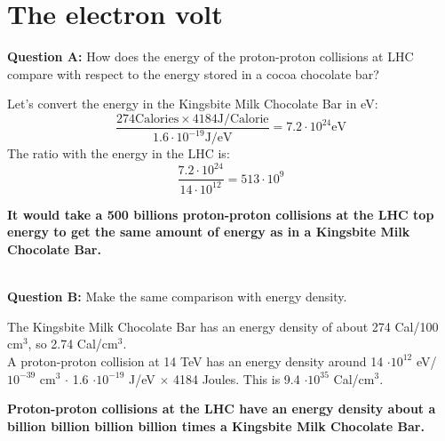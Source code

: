 \documentclass[12pt]{article}
\begin{document}
\section{The electron volt}
% 
% 


\textbf{Question A:} How does the energy of the proton-proton collisions at LHC compare with respect to the energy stored in a cocoa chocolate bar?\\ 

{\color{blue}

Let's convert the energy in the Kingsbite Milk Chocolate Bar in eV:
\begin{equation}
 \frac{ 274 \text{Calories} \times 4184 \text{J/Calorie} }{ 1.6 \cdot 10^{-19} \text{J/eV}} = 7.2 \cdot 10^{24} \text{eV}
\end{equation}
The ratio with the energy in the LHC is:
\begin{equation}
 \frac{7.2 \cdot 10^{24}}{14 \cdot 10^{12}} = 513 \cdot 10^{9}
\end{equation}

\textbf{It would take a 500 billions proton-proton collisions at the LHC top energy to get the same amount of energy as in a Kingsbite Milk Chocolate Bar.}
}\\

\textbf{Question B:} Make the same comparison with energy density.\\

{\color{blue}
The Kingsbite Milk Chocolate Bar has an energy density of about 274 Cal/100 cm$^3$, so 2.74 Cal/cm$^3$.\\
A proton-proton collision at 14 TeV has an energy density around 14 $\cdot 10^{12}$ eV/$10^{-39}$ cm$^3$ $\cdot$ 1.6 $\cdot 10^{-19}$ J/eV $\times$ 4184 Joules. This is 9.4 $\cdot 10^{35}$ Cal/cm$^3$.\\

\begin{center}
\textbf{Proton-proton collisions at the LHC have an energy density about a billion billion billion billion times a Kingsbite Milk Chocolate Bar.}\end{center}
}
    
\end{document}

